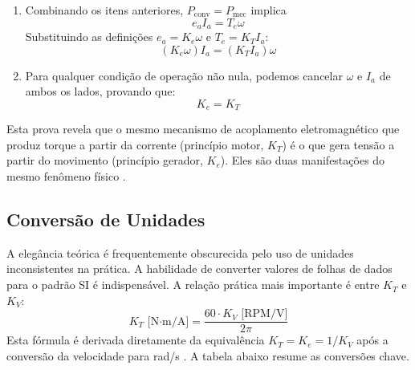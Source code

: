 \begin{enumerate}
    \item Combinando os itens anteriores, $P_{\text{conv}} = P_{\text{mec}}$ implica
    \begin{equation}
        e_a I_a = T_e \omega
    \end{equation}
    Substituindo as definições $e_a = K_e \omega$ e $T_e = K_T I_a$:
    \begin{equation}
        (K_e \omega) I_a = (K_T I_a) \omega
    \end{equation}

    \item Para qualquer condição de operação não nula, podemos cancelar $\omega$ e $I_a$ de ambos os lados, provando que:
    \begin{equation}
        K_e = K_T
    \end{equation}
\end{enumerate}
Esta prova revela que o mesmo mecanismo de acoplamento eletromagnético que produz torque a partir da corrente (princípio motor, $K_T$) é o que gera tensão a partir do movimento (princípio gerador, $K_e$). Eles são duas manifestações do mesmo fenômeno físico \parencite{zoltan2012understanding, garcia1997modelagem}.

\subsection{Conversão de Unidades}

A elegância teórica é frequentemente obscurecida pelo uso de unidades inconsistentes na prática. A habilidade de converter valores de folhas de dados para o padrão SI é indispensável. A relação prática mais importante é entre $K_T$ e $K_V$:
\begin{equation}
    K_T \text{ [N·m/A]} = \frac{60 \cdot K_V \text{ [RPM/V]}}{2\pi}
\end{equation}
Esta fórmula é derivada diretamente da equivalência $K_T = K_e = 1/K_V$ após a conversão da velocidade para rad/s \parencite{infineon2011bldc}. A tabela abaixo resume as conversões chave.

\begin{table}[htbp]
\centering
\caption{Unidades de Constantes de Motor e Fatores de Conversão para o SI}
\label{tab:unidades}

\end{table}

